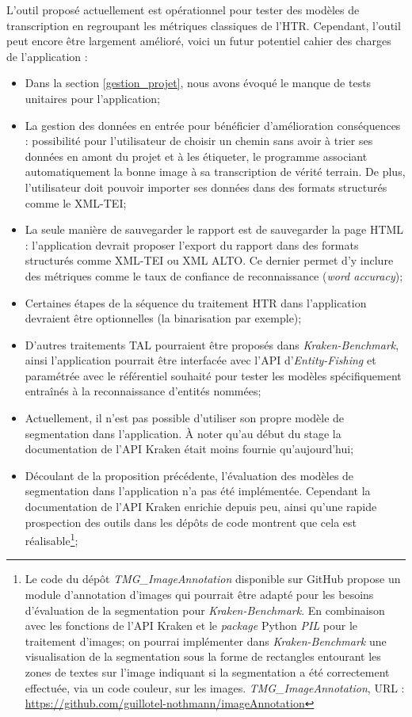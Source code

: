 L'outil proposé actuellement est opérationnel pour tester des modèles de transcription en regroupant les métriques classiques de l'HTR. Cependant, l'outil peut encore être largement amélioré, voici un futur potentiel cahier des charges de l'application :
\begin{itemize}
    \item Dans la section \ref{gestion_projet}, nous avons évoqué le manque de tests unitaires pour l'application;
    \item La gestion des données en entrée pour bénéficier d'amélioration conséquences : possibilité pour l'utilisateur de choisir un chemin sans avoir à trier ses données en amont du projet et à les étiqueter, le programme associant automatiquement la bonne image à sa transcription de vérité terrain. De plus, l'utilisateur doit pouvoir importer ses données dans des formats structurés comme le XML-TEI;
    \item La seule manière de sauvegarder le rapport est de sauvegarder la page HTML : l'application devrait proposer l'export du rapport dans des formats structurés comme XML-TEI ou XML ALTO. Ce dernier permet d'y inclure des métriques comme le taux de confiance de reconnaissance (\textit{word accuracy}); 
    \item Certaines étapes de la séquence du traitement HTR dans l'application devraient être optionnelles (la binarisation par exemple);
    \item D'autres traitements TAL pourraient être proposés dans \textit{Kraken-Benchmark}, ainsi l'application pourrait être interfacée avec l'API d'\textit{Entity-Fishing} et paramétrée avec le référentiel souhaité pour tester les modèles spécifiquement entraînés à la reconnaissance d'entités nommées; 
    \item Actuellement, il n'est pas possible d'utiliser son propre modèle de segmentation dans l'application. À noter qu'au début du stage la documentation de l'API Kraken était moins fournie qu'aujourd'hui;
    \item Découlant de la proposition précédente, l'évaluation des modèles de segmentation dans l'application n'a pas été implémentée. Cependant la documentation de l'API Kraken enrichie depuis peu, ainsi qu'une rapide prospection des outils dans les dépôts de code montrent que cela est réalisable\footnote{Le code du dépôt \textit{TMG\_ImageAnnotation} disponible sur GitHub propose un module d'annotation d'images qui pourrait être adapté pour les besoins d'évaluation de la segmentation pour \textit{Kraken-Benchmark}. En combinaison avec les fonctions de l'API Kraken et le \textit{package} Python \textit{PIL} pour le traitement d'images; on pourrai implémenter dans \textit{Kraken-Benchmark} une visualisation de la segmentation sous la forme de rectangles entourant les zones de textes sur l'image indiquant si la segmentation a été correctement effectuée, via un code couleur, sur les images. \textit{TMG\_ImageAnnotation}, URL : \url{https://github.com/guillotel-nothmann/imageAnnotation}};

\end{itemize}
